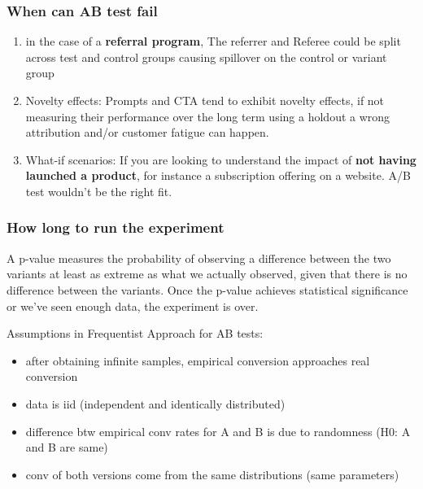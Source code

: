 \documentclass{beamer}
\begin{document}
\begin{frame}\frametitle{When can AB test fail}
\begin{enumerate}
	\item in the case of a \textbf{referral program}, The referrer and Referee could be split across test and control groups causing spillover on the control or variant group
	\item Novelty effects: Prompts and CTA tend to exhibit novelty effects, if not measuring their performance over the long term using a holdout a wrong attribution and/or customer fatigue can happen.
	\item What-if scenarios: If you are looking to understand the impact of \textbf{not having launched a product}, for instance a subscription offering on a website. A/B test wouldn’t be the right fit.
\end{enumerate}
\end{frame}


\begin{frame}\frametitle{How long to run the experiment}
A p-value measures the probability of observing a difference between the two variants at least as extreme as what we actually observed, given that there is no difference between the variants. Once the p-value achieves statistical significance or we’ve seen enough data, the experiment is over.
\end{frame}



\begin{frame}
	Assumptions in Frequentist Approach for AB tests:
	\begin{itemize}
		\item after obtaining infinite samples, empirical conversion approaches real conversion
		\item data is iid (independent and identically distributed)
		\item difference btw empirical conv rates for A and B is due to randomness (H0: A and B are same)
		\item conv of both versions come from the same distributions (same parameters)
	\end{itemize}
	
\end{frame}
\end{document}

